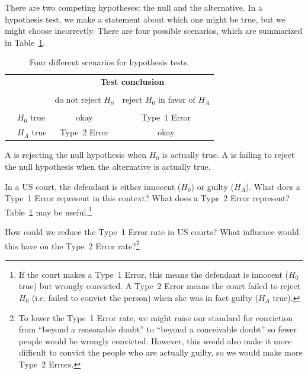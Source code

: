 There are two competing hypotheses: the null and the alternative.
In a hypothesis test, we make a statement about which one might
be true, but we might choose incorrectly. There are four possible
scenarios, which are summarized in Table~\ref{fourHTScenarios}.

\begin{table}[ht]
\centering
\begin{tabular}{l l c c}
& & \multicolumn{2}{c}{\textbf{Test conclusion}} \\
  \cline{3-4}
\vspace{-3.7mm} \\
& & do not reject $H_0$ &  reject $H_0$ in favor of $H_A$ \\
  \cline{2-4}
\vspace{-3.7mm} \\
& $H_0$ true & okay &  Type~1 Error \\
\raisebox{1.5ex}{\textbf{Truth}} & $H_A$ true & Type~2 Error & okay \\
  \cline{2-4}
\end{tabular}
\caption{Four different scenarios for hypothesis tests.}
\label{fourHTScenarios}
\end{table}

A  is rejecting the null hypothesis when
$H_0$ is actually true. A  is failing to
reject the null hypothesis when the alternative is actually
true.

\begin{exercise} \label{whatAreTheErrorTypesInUSCourts}
In a US court, the defendant is either innocent ($H_0$) or
guilty ($H_A$).
What does a Type~1 Error represent in this context?
What does a Type~2 Error represent?
Table~\ref{fourHTScenarios} may be useful.\footnote{If
  the court makes a Type~1 Error, this means the defendant
  is innocent ($H_0$ true) but wrongly convicted.
  A Type~2 Error means the court failed to reject $H_0$
  (i.e. failed to convict the person) when she was
  in fact guilty ($H_A$ true).}
\end{exercise}

\begin{exercise} \label{howToReduceType1ErrorsInUSCourts}
How could we reduce the Type~1 Error rate in US courts?
What influence would this have on the Type~2 Error
rate?\footnote{To lower the Type~1 Error rate, we might
  raise our standard for conviction from
  ``beyond a reasonable doubt'' to
  ``beyond a conceivable doubt'' so fewer people would
  be wrongly convicted. However, this would also make
  it more difficult to convict the people who are
  actually guilty, so we would make more Type~2 Errors.}
\end{exercise}

